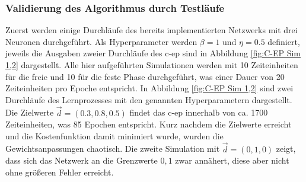\subsubsection{Validierung des Algorithmus durch Testläufe}
\label{chap:Validierung des Algorithmus durch Testläufe}

Zuerst werden einige Durchläufe des bereits implementierten Netzwerks mit drei Neuronen durchgeführt. Als Hyperparameter werden \(\beta=1\) und \(\eta=0.5\) definiert, jeweils die Ausgaben zweier Durchläufe des \gls{c-ep} sind in Abbildung \ref{fig:C-EP Sim 1,2} dargestellt. Alle hier aufgeführten Simulationen werden mit 10 Zeiteinheiten für die freie und 10 für die feste Phase durchgeführt, was einer Dauer von 20 Zeiteinheiten pro Epoche entspricht. In Abbildung \ref{fig:C-EP Sim 1,2} sind zwei Durchläufe des Lernprozesses mit den genannten Hyperparametern dargestellt. Die Zielwerte \(\vec{d}=(0.3,0.8,0.5)\) findet das \gls{c-ep} innerhalb von ca. 1700 Zeiteinheiten, was 85 Epochen entspricht. Kurz nachdem die Zielwerte erreicht und die Kostenfunktion damit minimiert wurde, wurden die Gewichtsanpassungen chaotisch. Die zweite Simulation mit \(\vec{d}=(0,1,0)\) zeigt, dass sich das Netzwerk an die Grenzwerte \(0,1\) zwar annähert, diese aber nicht ohne größeren Fehler erreicht.

